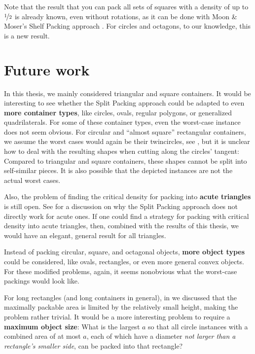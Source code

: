 \documentclass[a4paper,style=print,bibliography=totoc,nexus,lnum,extramargin]{tubsbook}
\begin{document}
Note that the result that you can pack all sets of squares with a density of up to $\nicefrac 1 2$ is already known, even without rotations, as it can be done with Moon \& Moser's Shelf Packing approach \cite{MM1967some}. For circles and octagons, to our knowledge, this is a new result.

\chapter{Future work}\label{ch:future-work}

In this thesis, we mainly considered triangular and square containers. It would be interesting to see whether the Split Packing approach could be adapted to even \textbf{more container types}, like circles, ovals, regular polygons, or generalized quadrilaterals. For some of these container types, even the worst-case instance does not seem obvious. For circular and “almost square” rectangular containers, we assume the worst cases would again be their twincircles, see , but it is unclear how to deal with the resulting shapes when cutting along the circles' tangent: Compared to triangular and square containers, these shapes cannot be split into self-similar pieces. It is also possible that the depicted instances are not the actual worst cases.


Also, the problem of finding the critical density for packing into \textbf{acute triangles} is still open. See  for a discussion on why the Split Packing approach does not directly work for acute ones. If one could find a strategy for packing with critical density into acute triangles, then, combined with the results of this thesis, we would have an elegant, general result for all triangles.

Instead of packing circular, square, and octagonal objects, \textbf{more object types} could be considered, like ovals, rectangles, or even more general convex objects. For these modified problems, again, it seems nonobvious what the worst-case packings would look like.

For long rectangles (and long containers in general), in  we discussed that the maximally packable area is limited by the relatively small height, making the problem rather trivial. It would be a more interesting problem to require a \textbf{maximum object size}: What is the largest $a$ so that all circle instances with a combined area of at most $a$, each of which have a diameter \emph{not larger than a rectangle's smaller side}, can be packed into that rectangle?
\end{document}
